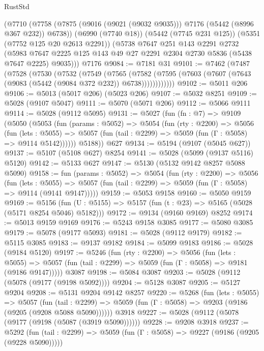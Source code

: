 \begin{lexlean}{RustStd}
\begin{coremodule}
    (@7710
      (@7758 (@7875 (@9016 (@9021 (@9032 @9035))) @7176 (@5442 (@8996 @367 @232)) @6738))
      (@6990 (@7740 @18))
      (@5442 (@7745 @231 @125))
      (@5351 (@7752 @125 @20 @2613 @2291))
      (@5738
        @7647
        @251
        @143
        @2291
        @2732
        (@5983 @7647 @2225 @125 @143 @49 @27 @2291 @2304 @2730 @5836 (@5438 @7647 @2225) @9035)))
    @7176
@9084 := @7181 @31
@9101 := @7462
    (@7487
      (@7528
        (@7530
          (@7532
            (@7549
              (@7565
                (@7582
                  (@7595 (@7603 (@7607 (@7643 (@9083 (@5442 (@9084 @372 @232)) @6738))))))))))))
@9102 := @5011 @206
@9106 := @5013 (@5017 @206) (@5023 @206)
@9107 := @5032 @8251
@9109 := @5028 (@9107 @5047)
@9111 := @5070 (@5071 @206)
@9112 := @5066 @9111
@9114 := @5028 (@9112 @5095)
@9131 := @5027
    (fun (fn : @7) =>
    @9109
      (@5050
        (@5053
          (fun (params : @5052) =>
          @5054
            (fun (rty : @2200) =>
            @5056
              (fun (lets : @5055) =>
              @5057 (fun (tail : @2299) => @5059 (fun (Γ : @5058) => @9114 @5142))))))
        @5188))
    @627
@9134 := @5194 (@9107 (@5045 @627))
@9137 := @5107 (@5108 @627) @8254
@9141 := @5028 (@5099 (@9137 @5116) @5120)
@9142 := @5133 @627
@9147 := @5130 (@5132 @9142 @8257 @5088 @5090)
@9158 := fun (params : @5052) =>
  @5054
    (fun (rty : @2200) =>
    @5056
      (fun (lets : @5055) =>
      @5057 (fun (tail : @2299) => @5059 (fun (Γ : @5058) => @9114 (@9141 @9147)))))
@9159 := @5053 @9158
@9160 := @5050 @9159
@9169 := @5156 (fun (U : @5155) => @5157 (fun (t : @23) => @5165 (@5028 (@5171 @8254 @5046) @5182)))
@9172 := @9134 (@9160 @9169) @8252
@9174 := @5013 @9159 @9169
@9176 := @5243 @9158 @3085
@9177 := @5080 @3085
@9179 := @5078 (@9177 @5093)
@9181 := @5028 (@9112 @9179)
@9182 := @5115 @3085
@9183 := @9137 @9182
@9184 := @5099 @9183
@9186 := @5028 (@9184 @5120)
@9197 := @5246
    (fun (rty : @2200) =>
    @5056
      (fun (lets : @5055) =>
      @5057 (fun (tail : @2299) => @5059 (fun (Γ : @5058) => @9181 (@9186 @9147)))))
    @3087
@9198 := @5084 @3087
@9203 := @5028 (@9112 (@5078 (@9177 (@9198 @5092))))
@9204 := @5128 @3087
@9205 := @5127 @9204
@9208 := @5131 @9204 @9142 @8257
@9220 := @5268
    (fun (lets : @5055) =>
    @5057
      (fun (tail : @2299) => @5059 (fun (Γ : @5058) => @9203 (@9186 (@9205 (@9208 @5088 @5090))))))
    @3918
@9227 := @5028 (@9112 (@5078 (@9177 (@9198 (@5087 (@3919 @5090))))))
@9228 := @9208 @3918
@9237 := @5292
    (fun (tail : @2299) => @5059 (fun (Γ : @5058) => @9227 (@9186 (@9205 (@9228 @5090)))))

\end{coremodule}
\end{lexlean}
